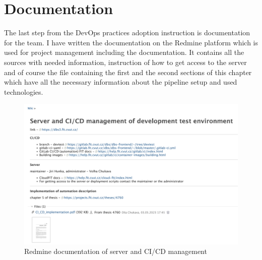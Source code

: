 \section{Documentation} The last step from the DevOps practices adoption instruction is documentation for the team. I have written the documentation on the Redmine platform which is used for project management including the documentation. It contains all the sources with needed information, instruction of how to get access to the server and of course the file containing the first and the second sections of this chapter which have all the necessary information about the pipeline setup and used technologies. 

\begin{figure}[ht]
\centering
\includegraphics[scale=0.5]{../png/redmine.png}
\caption{Redmine documentation of server and CI/CD management}
\end{figure}

